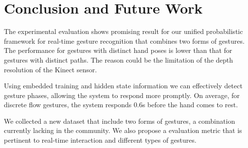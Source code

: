 \documentclass[conference]{IEEEtran}
\begin{document}


%
%


\section{Conclusion and Future Work}
The experimental evaluation shows promising result for our unified
probabilistic framework for real-time gesture recognition that combines two forms of gestures.
The performance for gestures with distinct hand poses is lower than that for
gestures with distinct paths. The reason could be the limitation of the depth
resolution of the Kinect sensor.

Using embedded training and hidden state information we can effectively
detect gesture phases, allowing the system to respond more promptly. On average,
for discrete flow gestures, the system responds 0.6s before the hand comes to
rest. 

We collected a new dataset that include two forms of gestures, a
combination currently lacking in the community. We also propose a
evaluation metric that is pertinent to real-time interaction and different types of gestures.
 
\end{document}
